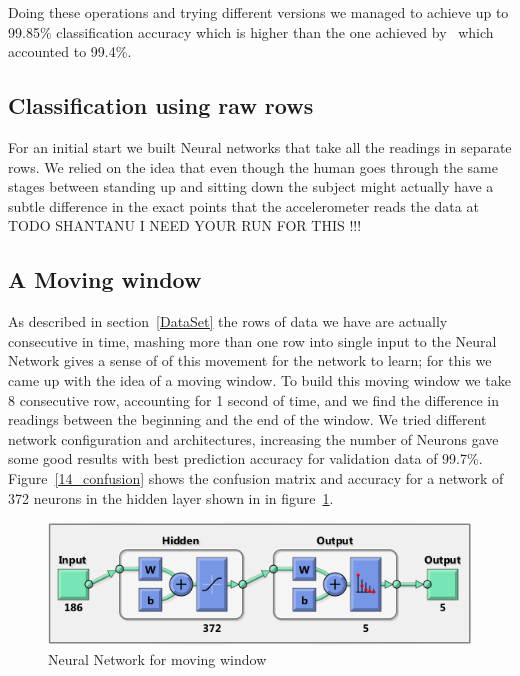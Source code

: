 \documentclass{article}
\begin{document}
Doing these operations and trying different versions we managed to achieve up to 99.85\% classification accuracy which is higher 
than the one achieved by~\cite{ugulino2012wearable} which accounted to 99.4\%. 


\subsection{Classification using raw rows}
\label{simple_rows}
For an initial start we built Neural networks that take all the readings in separate rows. We relied on the idea that even though the
human goes through the same stages between standing up and sitting down the subject might actually have a subtle difference in the exact
points that the accelerometer reads the data at TODO SHANTANU I NEED YOUR RUN FOR THIS !!!

\subsection{A Moving window}
\label{consecutive_rows}
As described in section~\ref{DataSet} the rows of data we have are actually consecutive in time, mashing more than one row into single input
to the Neural Network gives a sense of of this movement for the network to learn; for this we came up with the idea of a moving window.
To build this moving window we take 8 consecutive row, accounting for 1 second of time, and we find the difference in readings between the 
beginning and the end of the window. We tried different network configuration and architectures, increasing the number of Neurons gave some
good results with best prediction accuracy for validation data of 99.7\%. Figure~\ref{14_confusion} shows the confusion matrix and 
accuracy for a network of 372 neurons in the hidden layer shown in in figure~\ref{14_net}.


\begin{figure}
\includegraphics{14_net}
\caption{Neural Network for moving window}
\label{14_net}
\end{figure}
\end{document}
